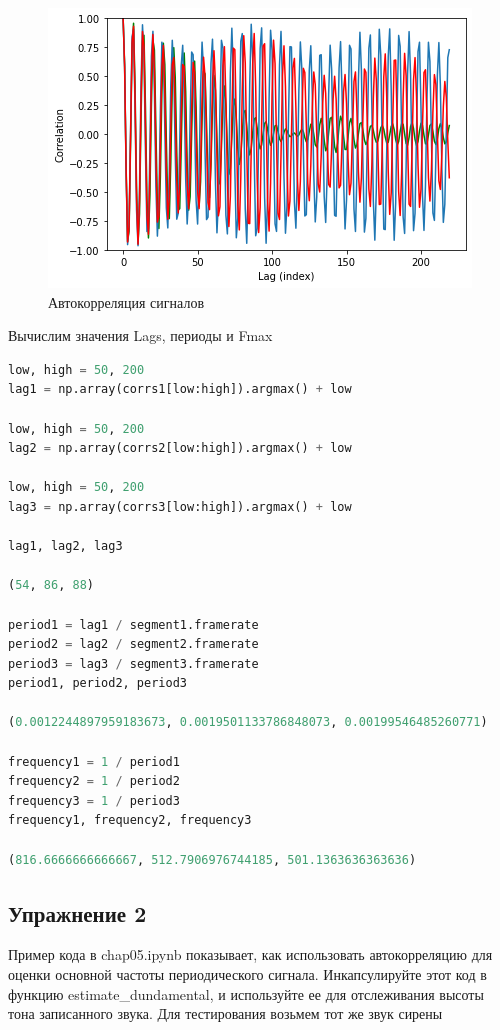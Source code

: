 \begin{figure}[H]
	\begin{center}
		\includegraphics[scale=1]{fig/lab05/lab05_02.png}
		\caption{Автокорреляция сигналов}
	\end{center}
\end{figure}

Вычислим значения Lags, периоды и Fmax

\begin{lstlisting}[language=Python]
low, high = 50, 200
lag1 = np.array(corrs1[low:high]).argmax() + low

low, high = 50, 200
lag2 = np.array(corrs2[low:high]).argmax() + low

low, high = 50, 200
lag3 = np.array(corrs3[low:high]).argmax() + low

lag1, lag2, lag3

(54, 86, 88)

period1 = lag1 / segment1.framerate
period2 = lag2 / segment2.framerate
period3 = lag3 / segment3.framerate
period1, period2, period3

(0.0012244897959183673, 0.0019501133786848073, 0.00199546485260771)

frequency1 = 1 / period1
frequency2 = 1 / period2
frequency3 = 1 / period3
frequency1, frequency2, frequency3

(816.6666666666667, 512.7906976744185, 501.1363636363636)
\end{lstlisting}


\subsection{Упражнение 2}
Пример кода в chap05.ipynb показывает, как использовать автокорреляцию для оценки основной частоты периодического сигнала. Инкапсулируйте этот код в функцию estimate_dundamental, и используйте ее для отслеживания высоты тона записанного звука. Для тестирования возьмем тот же звук сирены

